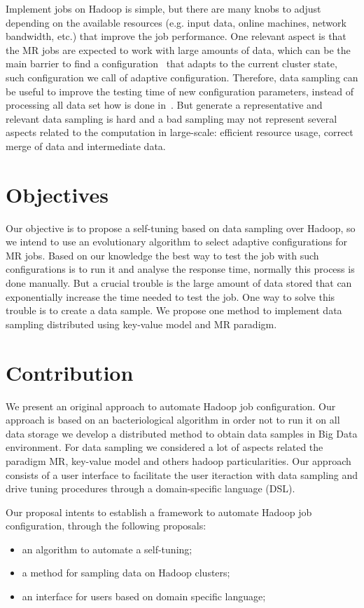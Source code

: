 Implement jobs on Hadoop is simple, but there are many knobs to adjust depending
on the available resources (e.g. input data, online machines, network bandwidth, etc.)
that improve the job performance. One relevant aspect is that the MR jobs are expected
to work with large amounts of data, which can be the main barrier to find a
configuration~\cite{Chen:2012} that adapts to the current cluster state, such
configuration we call of adaptive configuration. Therefore, data sampling can be
useful to improve the testing time of new configuration parameters,
instead of processing all data set how is done in~\cite{starfish}. But generate
a representative and relevant data sampling is hard and a bad sampling may not
represent several aspects related to the computation in large-scale: efficient
resource usage, correct merge of data and intermediate data.

\section{Objectives}
Our objective is to propose a self-tuning based on data sampling over Hadoop, so
we intend to use an evolutionary algorithm \cite{baudry} to select adaptive configurations
for MR jobs. Based on our knowledge the best way to test the job with such configurations
is to run it and analyse the response time, normally this process is done manually.
But a crucial trouble is the large amount of data stored that can exponentially 
increase the time needed to test the job. One way to solve this trouble is to create
a data sample. We propose one method to implement data sampling distributed using
key-value model and MR paradigm.

\section{Contribution}

We present an original approach to automate Hadoop job configuration. Our
approach is based on an bacteriological algorithm \cite{baudry} in order not to
run it on all data storage we develop a distributed method to obtain data samples
in Big Data environment. For data sampling we considered a lot of aspects related
the paradigm MR, key-value model and others hadoop particularities. Our approach
consists of a user interface to facilitate the user iteraction with data sampling
and drive tuning procedures through a domain-specific language (DSL).

Our proposal intents to establish a framework to automate Hadoop job configuration,
through the following proposals:
\begin{itemize}
	\item an algorithm to automate a self-tuning;
	\item a method for sampling data on Hadoop clusters;
	\item an interface for users based on domain specific language;
\end{itemize}

